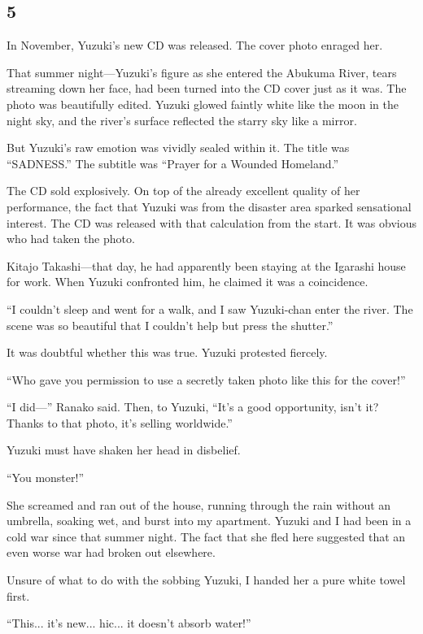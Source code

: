 \documentclass[
    a4paper,
    12pt,
    twoside,
    openany,
    UTF8,
    fontset=windows
]{ctexbook}
\begin{document}
\subsection*{5}

In November, Yuzuki's new CD was released. The cover photo enraged her.

That summer night---Yuzuki's figure as she entered the Abukuma River, tears streaming down her face, had been turned into the CD cover just as it was. The photo was beautifully edited. Yuzuki glowed faintly white like the moon in the night sky, and the river's surface reflected the starry sky like a mirror.

But Yuzuki's raw emotion was vividly sealed within it. The title was ``SADNESS.'' The subtitle was ``Prayer for a Wounded Homeland.''

The CD sold explosively. On top of the already excellent quality of her performance, the fact that Yuzuki was from the disaster area sparked sensational interest. The CD was released with that calculation from the start. It was obvious who had taken the photo.

Kitajo Takashi---that day, he had apparently been staying at the Igarashi house for work. When Yuzuki confronted him, he claimed it was a coincidence.

``I couldn't sleep and went for a walk, and I saw Yuzuki-chan enter the river. The scene was so beautiful that I couldn't help but press the shutter.''

It was doubtful whether this was true. Yuzuki protested fiercely.

``Who gave you permission to use a secretly taken photo like this for the cover!''

``I did---'' Ranako said. Then, to Yuzuki, ``It's a good opportunity, isn't it? Thanks to that photo, it's selling worldwide.''

Yuzuki must have shaken her head in disbelief.

``You monster!''

She screamed and ran out of the house, running through the rain without an umbrella, soaking wet, and burst into my apartment. Yuzuki and I had been in a cold war since that summer night. The fact that she fled here suggested that an even worse war had broken out elsewhere.

Unsure of what to do with the sobbing Yuzuki, I handed her a pure white towel first.

``This... it's new... hic... it doesn't absorb water!''
\end{document}
